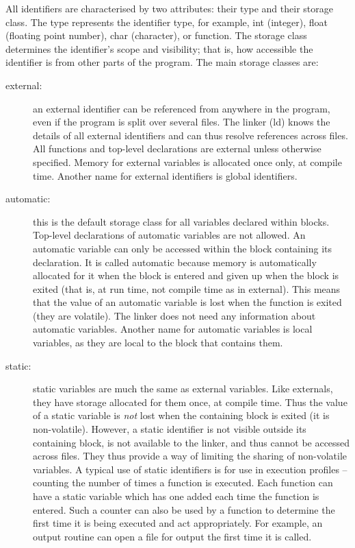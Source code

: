      All identifiers are characterised by two attributes: their {\kc
type\/} and their {\kc storage class\/}.  The  type  represents the 
identifier type,  for  example,  {\cd int} (integer), {\cd float} 
(floating point  number), {\cd char} (character), or function. The
storage class  determines the  identifier's {\kc scope\/}  
and {\kc visibility\/}; that is, how accessible the 
identifier is from other
parts of the program. The main storage classes are:
\begin{description}

\item[external:] 
an external 
identifier can be referenced from
anywhere in the program, even  if the  program is  split over 
several  files.  The linker ({\cmd ld})  knows the  details of  all
external  identifiers and can thus resolve  references across  files.
All functions and top-level declarations are  external unless 
otherwise specified.  Memory for external variables is allocated once
only, at compile time. Another name for external identifiers is {\kc
global identifiers\/}.

\item[automatic:] 
this is the 
default storage class for all variables
declared within blocks.  Top-level declarations of automatic
variables are  not allowed.  An automatic variable can only be
accessed within the block containing 
its  declaration.   It  is  
called  automatic because  memory  is automatically allocated  for it
when the block is entered and given up when the block is exited (that
is, at run time, not compile time as in external). This means that
the value of an automatic variable is lost  when the  function is 
exited (they are {\kc volatile}).  The linker does 
not need any information about  automatic
variables.  Another name for automatic variables is {\kc local
variables\/}, as they are local to the block that contains them.

\item[static:] 
static  
variables are much the same as external
variables. Like externals, they  have storage  allocated for  them
once, at compile time. Thus  the value  of a  static variable  is
{\em not}  lost when the containing block  is exited (it is 
{\kc non-volatile}).  However, a
static  identifier is not visible outside its containing block, is
not available to  the linker, and thus cannot be accessed across
files.  They thus  provide a  way of limiting  the  sharing  of 
non-volatile variables. A  typical use  of static  identifiers  is  for 
use  in execution profiles  -- counting the number  of times  a
function is executed. Each  function can have a  static variable
which has one added each time the function is entered.  Such a
counter can also be used by a function to determine the first time it
is being executed and act appropriately.  For example, an output routine 
can open a file for output the first time it is called.


\end{description}
